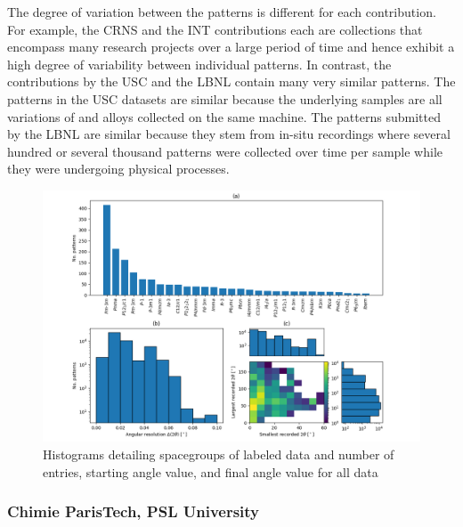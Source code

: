 The degree of variation between the patterns is different for each contribution. For example, the CRNS and the INT contributions each are collections that encompass many research projects over a large period of time and hence exhibit a high degree of variability between individual patterns. In contrast, the contributions by the USC and the LBNL contain many very similar patterns. The patterns in the USC datasets are similar because the underlying samples are all variations of  and  alloys collected on the same machine. The patterns submitted by the LBNL are similar because they stem from in-situ recordings where several hundred or several thousand patterns were collected over time per sample while they were undergoing physical processes. 
\begin{figure}[!htb]
    \centering
    \includegraphics[width=0.95\linewidth]{figures/quantities_hist.png}
    \caption{Histograms detailing spacegroups of labeled data and number of entries, starting angle value, and final angle value for all data}
    \label{fig:histograms}
\end{figure}

\subsubsection*{Chimie ParisTech, PSL University}

